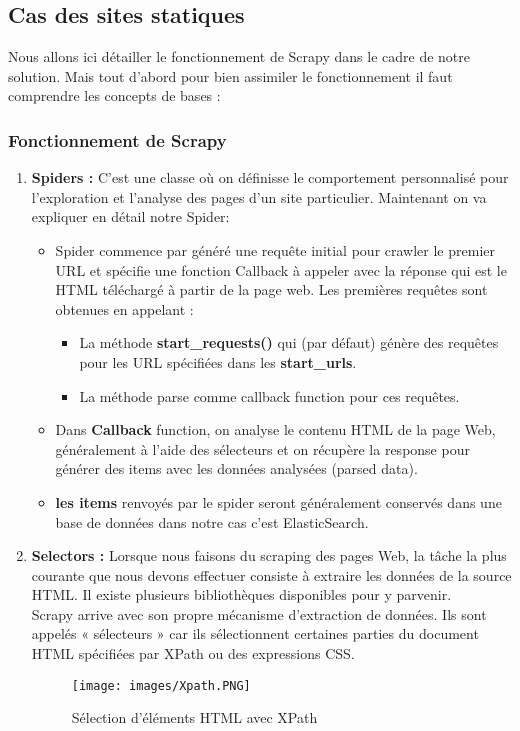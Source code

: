 \subsection{Cas des sites statiques}
Nous allons ici détailler le fonctionnement de Scrapy dans le cadre de notre solution.
Mais tout d’abord pour bien assimiler le fonctionnement il faut comprendre les concepts de bases :
\subsubsection{Fonctionnement de Scrapy}
\begin{enumerate}
\item\textbf{Spiders :} C’est une classe où on définisse le comportement personnalisé pour l'exploration et l'analyse des pages d'un site particulier.
Maintenant on va expliquer en détail notre Spider:
    \begin{itemize}[label=,font=\normalsize]
        \addtolength{\itemindent}{0cm}
        \item Spider commence par généré une requête initial pour crawler le premier URL et spécifie une fonction Callback à appeler avec la réponse qui est le HTML téléchargé à partir de la page web.
        Les premières requêtes sont obtenues en appelant :
        \begin{itemize}
            \item La méthode \textbf{start\_requests()} qui (par défaut) génère des requêtes pour les URL spécifiées dans les \textbf{start\_urls}.
            \item La méthode parse comme callback function pour ces requêtes.
        \end{itemize}
        
       \item Dans \textbf{Callback} function, on  analyse le contenu HTML de la page Web, généralement à l'aide des sélecteurs et on récupère la response pour générer des items avec les données analysées (parsed data).
        \item\textbf{les items} renvoyés par le spider seront généralement conservés dans une base de données dans notre cas c’est ElasticSearch.
        
    \end{itemize}
    \item\textbf{Selectors :} Lorsque nous faisons du scraping  des pages Web, la tâche la plus courante que nous devons effectuer consiste à extraire les données de la source HTML. Il existe plusieurs bibliothèques disponibles pour y parvenir.\\
Scrapy arrive avec son propre mécanisme d'extraction de données. Ils sont appelés « sélecteurs » car ils sélectionnent certaines parties du document HTML spécifiées par XPath ou des expressions CSS.
\begin{figure}[H]
            \centering
            \texttt{[image: images/Xpath.PNG]}
            \caption{Sélection d'éléments HTML avec XPath \cite{book}}
             

\end{figure}
\end{enumerate}
